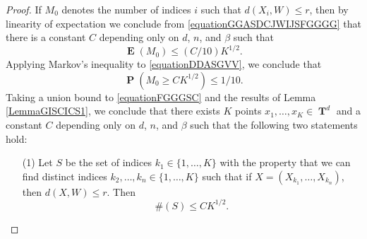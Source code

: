 \documentclass[dvipsnames,letterpaper,12pt]{article}
\numberwithin{equation}{section}
\DeclareMathOperator{\TT}{\mathbf{T}}
\numberwithin{theorem}{section}
\DeclareMathOperator{\EE}{\mathbf{E}}
\DeclareMathOperator{\PP}{\mathbf{P}}
\begin{document}
\begin{proof}
    If $M_0$ denotes the number of indices $i$ such that $d(X_i,W) \leq r$, then by linearity of expectation we conclude from \eqref{equationGGASDCJWIJSFGGGG} that there is a constant $C$ depending only on $d$, $n$, and $\beta$ such that
    \begin{equation} \label{equationDDASGVV}
        \EE(M_0) \leq (C/10) K^{1/2}.
    \end{equation}
    Applying Markov's inequality to \eqref{equationDDASGVV}, we conclude that
    \begin{equation} \label{equationFGGGSC}
        \PP(M_0 \geq C K^{1/2}) \leq 1/10.
    \end{equation}
    Taking a union bound to \eqref{equationFGGGSC} %
    and the results of Lemma \ref{LemmaGISCICS1}, we conclude that there exists $K$ points $x_1, \dots, x_K \in \TT^d$ and a constant $C$ depending only on $d$, $n$, and $\beta$ such that the following two statements hold:
    \begin{itemize}
        \item[(1)] Let $S$ be the set of indices $k_1 \in \{ 1, \dots, K \}$ with the property that we can find distinct indices $k_2, \dots, k_n \in \{ 1, \dots, K \}$ such that if $X = (X_{k_1}, \dots, X_{k_n})$, then $d(X, W) \leq r$. Then
        \begin{equation} \label{equationGGSC99124}
            \#(S) \leq C K^{1/2}.
        \end{equation}


\end{itemize}
\end{proof}
\end{document}
